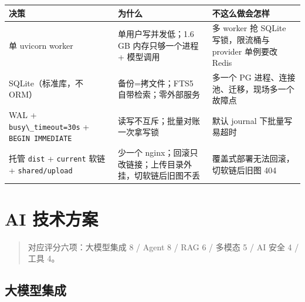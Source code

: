 {\def\LTcaptype{none} %
\begin{longtable}[]{@{}
  >{\raggedright\arraybackslash}p{}
  >{\raggedright\arraybackslash}p{}
  >{\raggedright\arraybackslash}p{}@{}}
\toprule\noalign{}
\begin{minipage}[b]{\linewidth}\raggedright
决策
\end{minipage} & \begin{minipage}[b]{\linewidth}\raggedright
为什么
\end{minipage} & \begin{minipage}[b]{\linewidth}\raggedright
不这么做会怎样
\end{minipage} \\
\midrule\noalign{}
\endhead
\bottomrule\noalign{}
\endlastfoot
单 uvicorn worker & 单用户写并发低；1.6 GB 内存只够一个进程 + 模型调用 &
多 worker 抢 SQLite 写锁，限流桶与 provider 单例要改 Redis \\
SQLite（标准库，不 ORM） & 备份=拷文件；FTS5 自带检索；零外部服务 &
多一个 PG 进程、连接池、迁移，现场多一个故障点 \\
WAL + \passthrough{\lstinline!busy\_timeout=30s!} +
\passthrough{\lstinline!BEGIN IMMEDIATE!} &
读写不互斥；批量对账一次拿写锁 & 默认 journal 下批量写易超时 \\
托管 \passthrough{\lstinline!dist!} + \passthrough{\lstinline!current!}
软链 + \passthrough{\lstinline!shared/upload!} & 少一个
nginx；回滚只改链接；上传目录外挂，切软链后旧图不丢 &
覆盖式部署无法回滚，切软链后旧图 404 \\
\end{longtable}
}

\section{AI 技术方案}\label{ai-ux80fdux529bux8bbeux8ba1}

\begin{quote}
对应评分六项：大模型集成 8 / Agent 8 / RAG 6 / 多模态 5 / AI 安全 4 /
工具 4。
\end{quote}

\subsection{大模型集成}\label{ux5927ux6a21ux578bux96c6ux6210}

